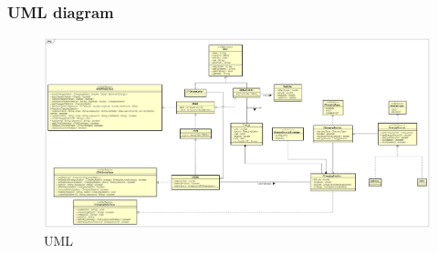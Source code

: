 \subsubsection{UML diagram}
\begin{figure}[h!]
      \begin{center}
            \includegraphics[keepaspectratio, width=16cm]{UML.png}
            \caption{UML}
      \end{center}
\end{figure}
